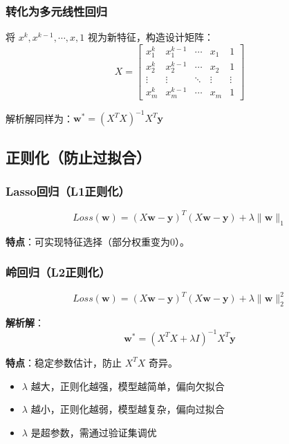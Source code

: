 \documentclass[12pt,a4paper]{ctexart}
\begin{document}
\subsubsection{转化为多元线性回归}

将 $x^k, x^{k-1}, \cdots, x, 1$ 视为新特征，构造设计矩阵：
\[
X = \begin{bmatrix}
x_1^k & x_1^{k-1} & \cdots & x_1 & 1 \\
x_2^k & x_2^{k-1} & \cdots & x_2 & 1 \\
\vdots & \vdots & \ddots & \vdots & \vdots \\
x_m^k & x_m^{k-1} & \cdots & x_m & 1
\end{bmatrix}
\]

解析解同样为：$\mathbf{w}^* = (X^TX)^{-1}X^T\mathbf{y}$

\subsection{正则化（防止过拟合）}

\subsubsection{Lasso回归（L1正则化）}

\[
Loss(\mathbf{w}) = (X\mathbf{w} - \mathbf{y})^T(X\mathbf{w} - \mathbf{y}) + \lambda\|\mathbf{w}\|_1
\]

\textbf{特点}：可实现特征选择（部分权重变为0）。

\subsubsection{岭回归（L2正则化）}

\[
Loss(\mathbf{w}) = (X\mathbf{w} - \mathbf{y})^T(X\mathbf{w} - \mathbf{y}) + \lambda\|\mathbf{w}\|_2^2
\]

\textbf{解析解}：
\[
\mathbf{w}^* = (X^TX + \lambda I)^{-1}X^T\mathbf{y}
\]

\textbf{特点}：稳定参数估计，防止 $X^TX$ 奇异。

\begin{notebox}
\begin{itemize}
    \item $\lambda$ 越大，正则化越强，模型越简单，偏向欠拟合
    \item $\lambda$ 越小，正则化越弱，模型越复杂，偏向过拟合
    \item $\lambda$ 是超参数，需通过验证集调优
\end{itemize}
\end{notebox}
\end{document}
